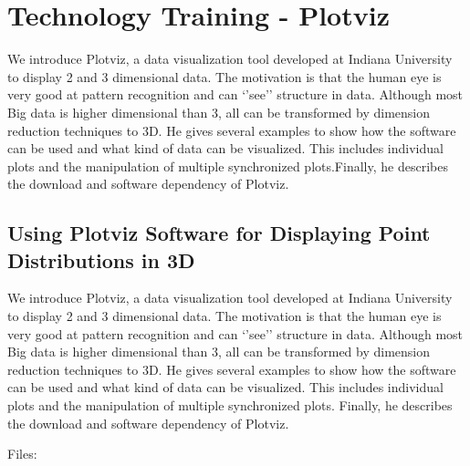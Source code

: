 

\chapter{Technology Training - Plotviz}

\FILENAME

We introduce Plotviz, a data visualization tool developed at Indiana
University to display 2 and 3 dimensional data. The motivation is that
the human eye is very good at pattern recognition and can `'see''
structure in data. Although most Big data is higher dimensional than 3,
all can be transformed by dimension reduction techniques to 3D. He gives
several examples to show how the software can be used and what kind of
data can be visualized. This includes individual plots and the
manipulation of multiple synchronized plots.Finally, he describes the
download and software dependency of Plotviz.

\section{Using Plotviz Software for Displaying Point Distributions in
  3D}

We introduce Plotviz, a data visualization tool developed at Indiana
University to display 2 and 3 dimensional data. The motivation is that
the human eye is very good at pattern recognition and can `'see''
structure in data. Although most Big data is higher dimensional than 3,
all can be transformed by dimension reduction techniques to 3D. He gives
several examples to show how the software can be used and what kind of
data can be visualized. This includes individual plots and the
manipulation of multiple synchronized plots. Finally, he describes the
download and software dependency of Plotviz.


Files:







